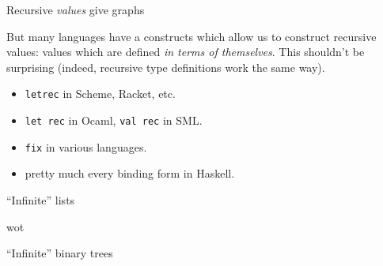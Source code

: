 \documentclass[ignorenonframetext]{beamer}
\newenvironment{Shaded}{}{}
\providecommand{\tightlist}{%
  \setlength{\itemsep}{0pt}\setlength{\parskip}{0pt}}
\begin{document}
\begin{frame}{%
\protect\hypertarget{recursive-values-give-trees}{%
Recursive \emph{values} give graphs}}

But many languages have a constructs which allow us to construct
recursive values: values which are defined \emph{in terms of
themselves}. This shouldn’t be surprising (indeed, recursive type
definitions work the same way).

\begin{itemize}
\tightlist
\item
  \texttt{letrec} in Scheme, Racket, etc.
\item
  \texttt{let\ rec} in Ocaml, \texttt{val\ rec} in SML.
\item
  \texttt{fix} in various languages.
\item
  pretty much every binding form in Haskell.
\end{itemize}

\end{frame}

\begin{frame}{``Infinite'' lists}

\begin{Shaded}
  wot
\end{Shaded}

\end{frame}

\begin{frame}{“Infinite” binary trees}

\begin{Shaded}
\end{Shaded}

\end{frame}
\end{document}
